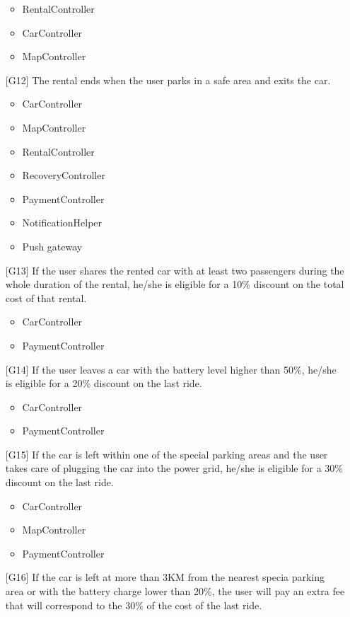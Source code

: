 \begin{itemize}
\begin{itemize}
			\item RentalController
			\item CarController
			\item MapController
		\end{itemize}
	\item[{[G12]}] The rental ends when the user parks in a safe area and exits the car.
		\begin{itemize}
			\item CarController
			\item MapController
			\item RentalController
			\item RecoveryController
			\item PaymentController
			\item NotificationHelper
			\item Push gateway
		\end{itemize}
	\item[{[G13]}] If the user shares the rented car with at least two passengers during the whole duration of the rental, he/she is eligible for a 10\% discount on the total cost of that rental.
		\begin{itemize}
			\item CarController
			\item PaymentController
		\end{itemize}
	\item[{[G14]}] If the user leaves a car with the battery level higher than 50\%, he/she is eligible for a 20\% discount on the last ride.
		\begin{itemize}
			\item CarController
			\item PaymentController
		\end{itemize}
	\item[{[G15]}] If the car is left within one of the special parking areas and the user takes care of plugging the car into the power grid, he/she is eligible for a 30\% discount on the last ride.
		\begin{itemize}
			\item CarController
			\item MapController
			\item PaymentController
		\end{itemize}
	\item[{[G16]}] If the car is left at more than 3KM from the nearest specia parking area or with the battery charge lower than 20\%, the user will pay an extra fee that will correspond to the 30\% of the cost of the last ride.

\end{itemize}

